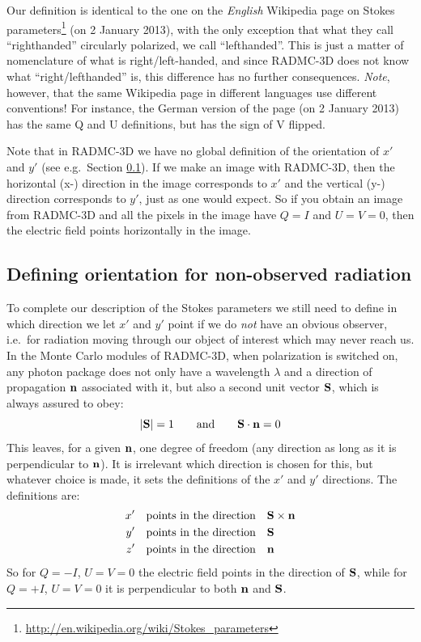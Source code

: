 \documentclass{report}
\begin{document}
Our definition is identical to the one on the {\em English} Wikipedia page
on Stokes
parameters\footnote{\url{http://en.wikipedia.org/wiki/Stokes_parameters}}
(on 2 January 2013), with the only exception that what they call
``righthanded'' circularly polarized, we call ``lefthanded''. This is just a
matter of nomenclature of what is right/left-handed, and since RADMC-3D does
not know what ``right/lefthanded'' is, this difference has no further
consequences. {\em Note}, however, that the same Wikipedia page in different
languages use different conventions! For instance, the German version of the
page (on 2 January 2013) has the same Q and U definitions, but has the sign
of V flipped.

Note that in RADMC-3D we have no global definition of the orientation of
$x'$ and $y'$ (see e.g.\ Section \ref{sec-orientation-vector-stokes}). If
we make an image with RADMC-3D, then the horizontal (x-) direction in the
image corresponds to $x'$ and the vertical (y-) direction corresponds to
$y'$, just as one would expect. So if you obtain an image from RADMC-3D
and all the pixels in the image have $Q=I$ and $U=V=0$, then the electric
field points horizontally in the image.

\subsection{Defining orientation for non-observed radiation}
\label{sec-orientation-vector-stokes}
%
To complete our description of the Stokes parameters we still need to define
in which direction we let $x'$ and $y'$ point if we do {\em not} have an
obvious observer, i.e.\ for radiation moving through our object of interest
which may never reach us. In the Monte Carlo modules of RADMC-3D, when
polarization is switched on, any photon package does not only have a
wavelength $\lambda$ and a direction of propagation ${\bf n}$ associated
with it, but also a second unit vector ${\bf S}$, which is always assured
to obey:
\begin{equation}
|{\bf S}| = 1 \qquad \hbox{and} \qquad {\bf S}\cdot{\bf n}=0
\end{equation}
This leaves, for a given ${\bf n}$, one degree of freedom (any direction as
long as it is perpendicular to ${\bf n}$). It is irrelevant which direction
is chosen for this, but whatever choice is made, it sets the definitions
of the $x'$ and $y'$ directions. The definitions are:
\begin{equation}
\begin{split}
x' & \quad\hbox{points in the direction}\quad {\bf S}\times {\bf n}\\
y' & \quad\hbox{points in the direction}\quad {\bf S}\\
z' & \quad\hbox{points in the direction}\quad {\bf n}
\end{split}
\end{equation}
So for $Q=-I$, $U=V=0$ the electric field points in the direction of
${\bf S}$, while for $Q=+I$, $U=V=0$ it is perpendicular to both
${\bf n}$ and ${\bf S}$. 
\end{document}
